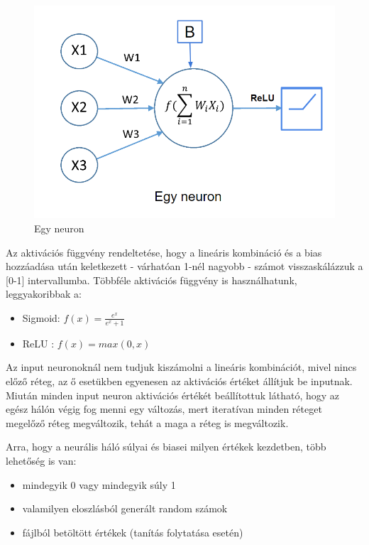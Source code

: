 \documentclass[12pt]{article}
\begin{document}
\begin{figure}[h!]
  \includegraphics[width=\linewidth]{neuron.png}
  \caption{Egy neuron}
\end{figure}

Az aktivációs függvény rendeltetése, hogy a lineáris kombináció és a bias hozzáadása után keletkezett - várhatóan 1-nél nagyobb - számot visszaskálázzuk a [0-1] intervallumba.
Többféle aktivációs függvény is használhatunk, leggyakoribbak a:

\begin{itemize}  
	\item Sigmoid: $f(x) = \frac{e^x}{e^x+1}$ 
	\item ReLU : $f(x) = max(0,x)$
\end{itemize}

Az input neuronoknál nem tudjuk kiszámolni a lineáris kombinációt, mivel nincs előző réteg, az ő esetükben egyenesen az aktivációs értéket állítjuk be inputnak. Miután minden input neuron aktivációs értékét beállítottuk látható, hogy az egész hálón végig fog menni egy változás, mert iteratívan minden réteget megelőző réteg megváltozik, tehát a maga a réteg is megváltozik.

Arra, hogy a neurális háló súlyai és biasei milyen értékek kezdetben, több lehetőség is van:
\begin{itemize}  
	\item mindegyik 0 vagy mindegyik súly 1
	\item valamilyen eloszlásból generált random számok
	\item fájlból betöltött értékek (tanítás folytatása esetén)
\end{itemize}
\end{document}

